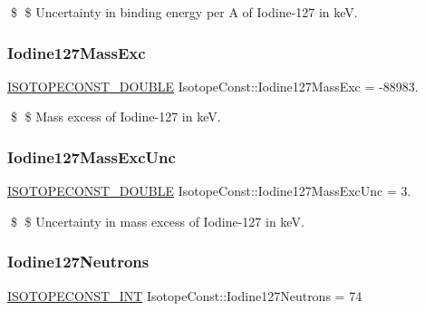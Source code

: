 \$ \$ Uncertainty in binding energy per A of Iodine-\/127 in keV. \mbox{\label{group___isotope_const-_iodine-_i127_gab194dbfe3b8e66d178bc36b5515e994f}} 
\subsubsection{\texorpdfstring{Iodine127\+Mass\+Exc}{Iodine127MassExc}}
{\footnotesize\ttfamily \mbox{\hyperlink{group___isotope_const-_macros_ga8f45a7272ce02c0b4c65c44636ed719a}{I\+S\+O\+T\+O\+P\+E\+C\+O\+N\+S\+T\+\_\+\+D\+O\+U\+B\+LE}} Isotope\+Const\+::\+Iodine127\+Mass\+Exc = -\/88983.}

\$ \$ Mass excess of Iodine-\/127 in keV. \mbox{\label{group___isotope_const-_iodine-_i127_gaf63a8a806159911635ce27d3ef560b84}} 
\subsubsection{\texorpdfstring{Iodine127\+Mass\+Exc\+Unc}{Iodine127MassExcUnc}}
{\footnotesize\ttfamily \mbox{\hyperlink{group___isotope_const-_macros_ga8f45a7272ce02c0b4c65c44636ed719a}{I\+S\+O\+T\+O\+P\+E\+C\+O\+N\+S\+T\+\_\+\+D\+O\+U\+B\+LE}} Isotope\+Const\+::\+Iodine127\+Mass\+Exc\+Unc = 3.}

\$ \$ Uncertainty in mass excess of Iodine-\/127 in keV. \mbox{\label{group___isotope_const-_iodine-_i127_gaa4f63469601d5091a9cc49f2f582dde7}} 
\subsubsection{\texorpdfstring{Iodine127\+Neutrons}{Iodine127Neutrons}}
{\footnotesize\ttfamily \mbox{\hyperlink{group___isotope_const-_macros_ga5f18360b3e99483a35c32d789e62621c}{I\+S\+O\+T\+O\+P\+E\+C\+O\+N\+S\+T\+\_\+\+I\+NT}} Isotope\+Const\+::\+Iodine127\+Neutrons = 74}

